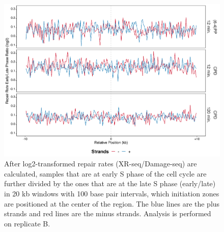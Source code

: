 \begin{figure}[H]
\begin{center}
\includegraphics[width=\textwidth]{Chapters/7_appendix/figures/supfig39}
\caption[Repair rate early/late ratio of initiation zones in 20 kb (replicate B).]{After log2-transformed repair rates (XR-seq/Damage-seq) are calculated, samples that are at early S phase of the cell cycle are further divided by the ones that are at the late S phase (early/late) in 20 kb windows with 100 base pair intervals, which initiation zones are positioned at the center of the region. The blue lines are the plus strands and red lines are the minus strands. Analysis is performed on replicate B.}
\label{supfig:rrel20inzonesB}
\end{center}
\end{figure}

